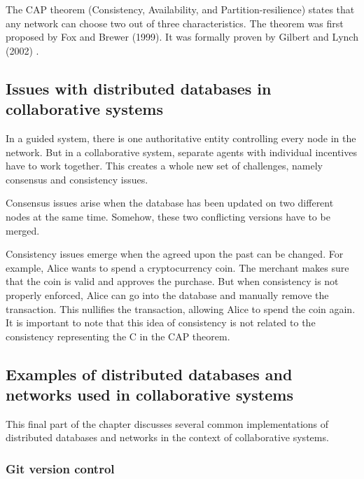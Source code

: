 The CAP theorem (Consistency, Availability, and Partition-resilience) states that any network can choose two out of three characteristics. The theorem was first proposed by Fox and Brewer (1999). It was formally proven by Gilbert and Lynch (2002) \cite{gilbert-lynch-cap-proof}.

\subsection{Issues with distributed databases in collaborative systems}
\label{subsec:issues-distributed-dbs}

In a guided system, there is one authoritative entity controlling every node in the network. But in a collaborative system, separate agents with individual incentives have to work together. This creates a whole new set of challenges, namely consensus and consistency issues.

Consensus issues arise when the database has been updated on two different nodes at the same time. Somehow, these two conflicting versions have to be merged. %

Consistency issues emerge when the agreed upon the past can be changed. For example, Alice wants to spend a cryptocurrency coin. The merchant makes sure that the coin is valid and approves the purchase. But when consistency is not properly enforced, Alice can go into the database and manually remove the transaction. This nullifies the transaction, allowing Alice to spend the coin again. It is important to note that this idea of consistency is not related to the consistency representing the C in the CAP theorem.

\subsection{Examples of distributed databases and networks used in collaborative systems}
\label{subsec:examples-distributed-dbs}

This final part of the chapter discusses several common implementations of distributed databases and networks in the context of collaborative systems. 

\subsubsection{Git version control}

